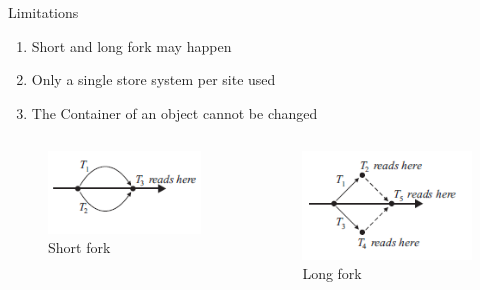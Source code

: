 \documentclass{beamer}
\begin{document}
	\begin{frame}{Limitations}

			\begin{enumerate}
			\item Short and long fork may happen
			\item Only a single store system per site used
			\item The Container of an object cannot be changed
			\end{enumerate}
			
	\begin{columns}
	\begin{column}[1]{5cm}
	\begin{figure}
	\includegraphics[width=1.0\textwidth]{img/fig_conflict01.png}
	\caption{Short fork}
	\end{figure}
	\end{column}
	\begin{column}[1]{5cm}
	\begin{figure}	
	\includegraphics[width=1.0\textwidth]{img/fig_conflict02.png}
	\caption{Long fork}
	\end{figure}
	\end{column}
	\end{columns}			
			
		\end{frame}
		
\end{document}
